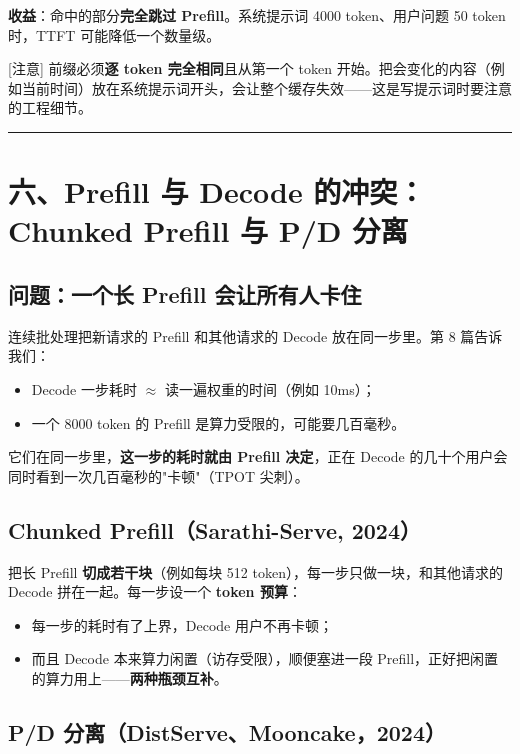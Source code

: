 \textbf{收益}：命中的部分\textbf{完全跳过 Prefill}。系统提示词 4000 token、用户问题 50 token 时，TTFT 可能降低一个数量级。

\begin{warningBox}[避坑指南与核心警示]
{}[注意] 前缀必须\textbf{逐 token 完全相同}且从第一个 token 开始。把会变化的内容（例如当前时间）放在系统提示词开头，会让整个缓存失效——这是写提示词时要注意的工程细节。
\end{warningBox}

\vspace{0.8em}\hrule\vspace{0.8em}

\section{六、Prefill 与 Decode 的冲突：Chunked Prefill 与 P/D 分离}

\subsection{问题：一个长 Prefill 会让所有人卡住}

连续批处理把新请求的 Prefill 和其他请求的 Decode 放在同一步里。第 8 篇告诉我们：
\begin{itemize}
  \item Decode 一步耗时 $\approx$ 读一遍权重的时间（例如 10ms）；
  \item 一个 8000 token 的 Prefill 是算力受限的，可能要几百毫秒。
\end{itemize}

它们在同一步里，\textbf{这一步的耗时就由 Prefill 决定}，正在 Decode 的几十个用户会同时看到一次几百毫秒的"卡顿"（TPOT 尖刺）。

\subsection{Chunked Prefill（Sarathi-Serve, 2024）}

把长 Prefill \textbf{切成若干块}（例如每块 512 token），每一步只做一块，和其他请求的 Decode 拼在一起。每一步设一个 \textbf{token 预算}：
\begin{itemize}
  \item 每一步的耗时有了上界，Decode 用户不再卡顿；
  \item 而且 Decode 本来算力闲置（访存受限），顺便塞进一段 Prefill，正好把闲置的算力用上——\textbf{两种瓶颈互补}。
\end{itemize}

\subsection{P/D 分离（DistServe、Mooncake，2024）}

